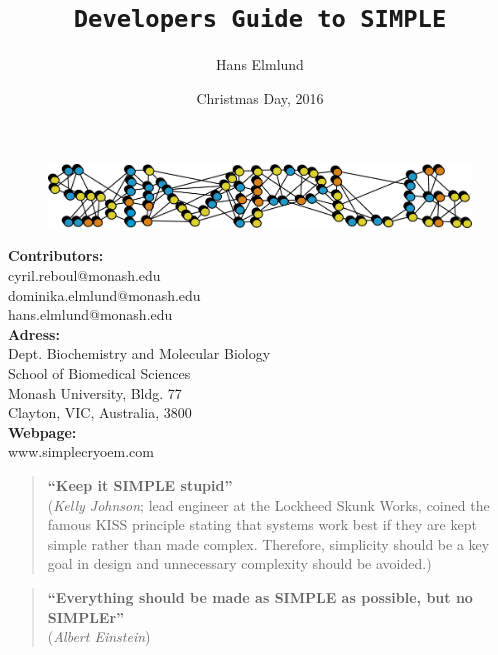 \documentclass[a4paper,11pt]{article}
\newcommand{\prgname}[1]{\textcolor{NavyBlue}{\texttt{#1}}}
\begin{document}
\begin{figure}
\centering
\includegraphics[keepaspectratio=true,scale=0.6]{../SIMPLE_logo/rawlogo}
\end{figure}

\title{\prgname{Developers Guide to SIMPLE}}
\date{Christmas Day, 2016}
\author{Hans Elmlund}
\maketitle

\vspace{1em}
\begin{minipage}[ht]{0.48\textwidth}
\textbf{Contributors:}\\
cyril.reboul@monash.edu\\
dominika.elmlund@monash.edu\\
hans.elmlund@monash.edu\\
\textbf{Adress:}\\
Dept. Biochemistry and Molecular Biology\\
School of Biomedical Sciences\\
Monash University, Bldg. 77\\
Clayton, VIC, Australia, 3800\\
\textbf{Webpage:}\\
www.simplecryoem.com\\
\end{minipage}
\vspace{20pt}

\begin{quote}
\textbf{``Keep it SIMPLE stupid''}\\(\textit{Kelly Johnson}; lead engineer at the Lockheed Skunk Works, coined the famous KISS principle stating that systems work best if they are kept simple rather than made complex. Therefore, simplicity should be a key goal in design and unnecessary complexity should be avoided.)
\end{quote}

\begin{quote}
\textbf{``Everything should be made as SIMPLE as possible, but no SIMPLEr''}\\(\textit{Albert Einstein})
\end{quote}
\end{document}
